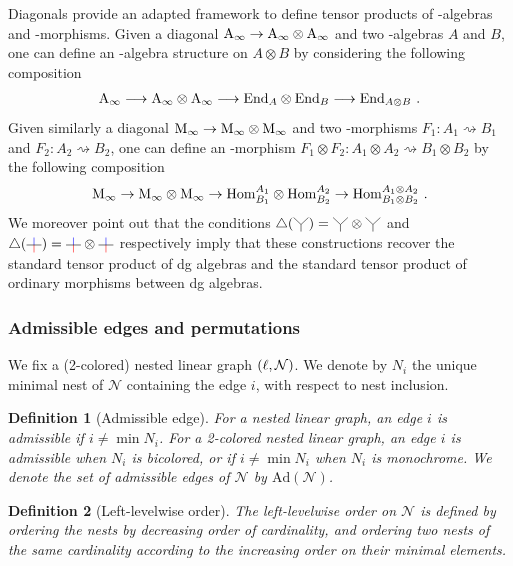 \documentclass[twoside, 11pt]{amsart}
\newtheorem{definition}{Definition}[section]
\theoremstyle{remark}
\begin{document}
Diagonals provide an adapted framework to define tensor products of \Ainf -algebras and \Ainf -morphisms.
Given a diagonal $\mathrm{A}_\infty \to \mathrm{A}_\infty \otimes \mathrm{A}_\infty$ and two \Ainf -algebras $A$ and $B$, one can define an \Ainf -algebra structure on $A \otimes B$ by considering the following composition
\[ \mathrm{A}_\infty \longrightarrow \mathrm{A}_\infty \otimes \mathrm{A}_\infty \longrightarrow \mathrm{End}_A \otimes \mathrm{End}_B \longrightarrow \mathrm{End}_{A \otimes B} \ . \]
Given similarly a diagonal $\mathrm{M}_\infty \to \mathrm{M}_\infty \otimes \mathrm{M}_\infty$ and two \Ainf -morphisms $F_1 : A_1 \rightsquigarrow B_1$ and $F_2 : A_2 \rightsquigarrow B_2$, one can define an \Ainf -morphism $F_1 \otimes F_2 : A_1 \otimes A_2 \rightsquigarrow B_1 \otimes B_2$ by the following composition
\[ \Minf \rightarrow \Minf \otimes \Minf \rightarrow \Hom^{A_1}_{B_1} \otimes \Hom^{A_2}_{B_2} \rightarrow  \Hom^{A_1 \otimes A_2}_{B_1 \otimes B_2} \ . \]
We moreover point out that the conditions $\triangle (\arbreopdeux) = \arbreopdeux \otimes \arbreopdeux$ and $\triangle ( \arbreopunmorph ) = \arbreopunmorph \otimes \arbreopunmorph$ respectively imply that these constructions recover the standard tensor product of dg algebras and the standard tensor product of ordinary morphisms between dg algebras.

\subsubsection{Admissible edges and permutations}

We fix a (2-colored) nested linear graph $(\ell,\mathcal{N})$.
We denote by $N_i$ the unique minimal nest of $\mathcal{N}$ containing the edge $i$, with respect to nest inclusion. 

\begin{definition}[Admissible edge]
For a nested linear graph, an edge $i$ is \emph{admissible} if $i \neq \min N_i$. 
For a 2-colored nested linear graph, an edge $i$ is \emph{admissible} when $N_i$ is bicolored, or if $i \neq \min N_i$ when $N_i$ is monochrome.
We denote the set of admissible edges of $\mathcal{N}$ by $\mathrm{Ad}(\mathcal{N})$. 
\end{definition}

\begin{definition} [Left-levelwise order]
\label{def:left-levelwise-graph}
The \emph{left-levelwise order} on $\mathcal{N}$ is defined by ordering the nests by decreasing order of cardinality, and ordering two nests of the same cardinality according to the increasing order on their minimal elements. 
\end{definition}
\end{document}
